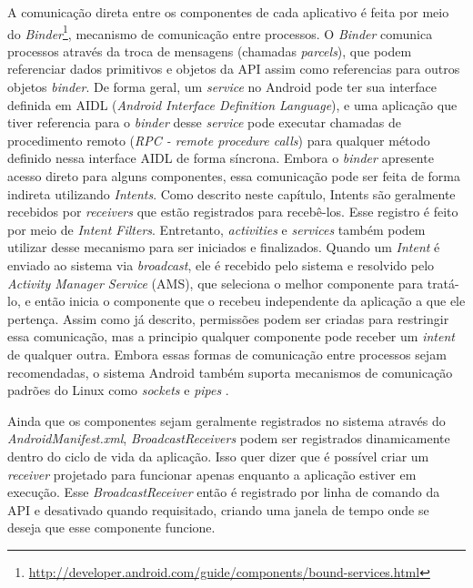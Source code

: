 A comunicação direta entre os componentes de cada aplicativo é feita por meio do \textit{Binder}\footnote{\url{http://developer.android.com/guide/components/bound-services.html}}, mecanismo de comunicação entre processos. O \textit{Binder} comunica processos através da troca de mensagens (chamadas \textit{parcels}), que podem referenciar dados primitivos e objetos da API assim como referencias para outros objetos \textit{binder}. De forma geral, um \textit{service} no Android pode ter sua interface definida em AIDL (\textit{Android Interface Definition Language}), e uma aplicação que tiver referencia para o \textit{binder} desse \textit{service} pode executar chamadas de procedimento remoto (\textit{RPC - remote procedure calls}) para qualquer método definido nessa interface AIDL de forma síncrona. Embora o \textit{binder} apresente acesso direto para alguns componentes, essa comunicação pode ser feita de forma indireta utilizando \textit{Intents}. Como descrito neste capítulo, Intents são geralmente recebidos por \textit{receivers} que estão registrados para recebê-los. Esse registro é feito por meio de \textit{Intent Filters}. Entretanto, \textit{activities} e \textit{services} também podem utilizar desse mecanismo para ser iniciados e finalizados. Quando um \textit{Intent} é enviado ao sistema via \textit{broadcast}, ele é recebido pelo sistema e resolvido pelo \textit{Activity Manager Service} (AMS), que seleciona o melhor componente para tratá-lo, e então inicia o componente que o recebeu independente da aplicação a que ele pertença. Assim como já descrito, permissões podem ser criadas para restringir essa comunicação, mas a principio qualquer componente pode receber um \textit{intent} de qualquer outra.  Embora essas formas de comunicação entre processos sejam recomendadas, o sistema Android também suporta mecanismos de comunicação padrões do Linux como \textit{sockets} e \textit{pipes} \cite{heuser2014}.

Ainda que os componentes sejam geralmente registrados no sistema através do \textit{AndroidManifest.xml}, \textit{BroadcastReceivers} podem ser registrados dinamicamente dentro do ciclo de vida da aplicação. Isso quer dizer que é possível criar um \textit{receiver} projetado para funcionar apenas enquanto a aplicação estiver em execução. Esse \textit{BroadcastReceiver} então é registrado por linha de comando da API e desativado quando requisitado, criando uma janela de tempo onde se deseja que esse componente funcione.

